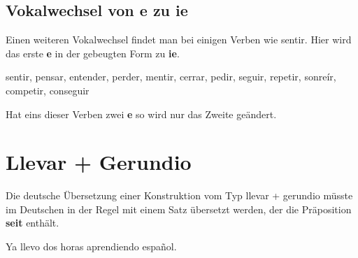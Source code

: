 \subsection*{Vokalwechsel von e zu ie}
Einen weiteren Vokalwechsel findet man bei einigen Verben wie sentir. Hier
wird das erste \textbf{e} in der gebeugten Form zu \textbf{ie}.
\begin{ejemplos}
    \item sentir, pensar, entender, perder, mentir, cerrar, pedir, seguir, 
    repetir, sonre\'ir, competir, conseguir
\end{ejemplos}
Hat eins dieser Verben zwei \textbf{e} so wird nur das Zweite geändert.
\section{Llevar + Gerundio}
Die deutsche Übersetzung einer Konstruktion vom Typ llevar + gerundio
müsste im Deutschen in der Regel mit einem Satz übersetzt werden,
der die Präposition \textbf{seit} enthält.
\begin{ejemplos}
    \item Ya llevo dos horas aprendiendo español.
\end{ejemplos}






